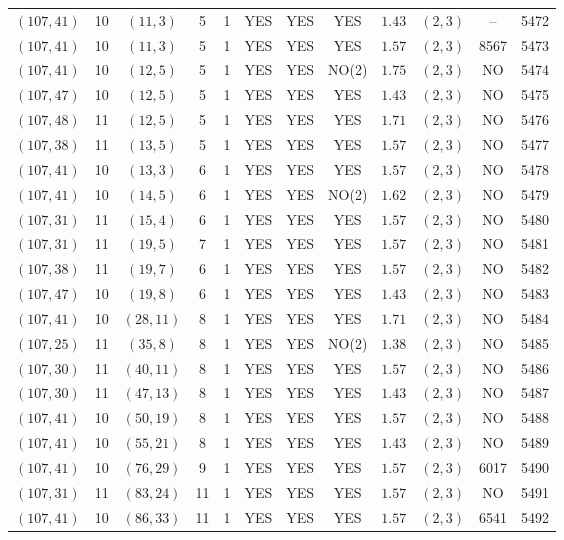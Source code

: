 \begin{longtable}{|c|c|c|c|c|c|c|c|c|c|c|c|}
$(107,41)$ & 10 & $(11,3)$ & 5 & 1 & YES & YES & YES & $1.43$ & $(2,3)$ & -- & 5472\\
$(107,41)$ & 10 & $(11,3)$ & 5 & 1 & YES & YES & YES & $1.57$ & $(2,3)$ & 8567 & 5473\\
$(107,41)$ & 10 & $(12,5)$ & 5 & 1 & YES & YES & NO(2) & $1.75$ & $(2,3)$ & NO & 5474\\
$(107,47)$ & 10 & $(12,5)$ & 5 & 1 & YES & YES & YES & $1.43$ & $(2,3)$ & NO & 5475\\
$(107,48)$ & 11 & $(12,5)$ & 5 & 1 & YES & YES & YES & $1.71$ & $(2,3)$ & NO & 5476\\
$(107,38)$ & 11 & $(13,5)$ & 5 & 1 & YES & YES & YES & $1.57$ & $(2,3)$ & NO & 5477\\
$(107,41)$ & 10 & $(13,3)$ & 6 & 1 & YES & YES & YES & $1.57$ & $(2,3)$ & NO & 5478\\
$(107,41)$ & 10 & $(14,5)$ & 6 & 1 & YES & YES & NO(2) & $1.62$ & $(2,3)$ & NO & 5479\\
$(107,31)$ & 11 & $(15,4)$ & 6 & 1 & YES & YES & YES & $1.57$ & $(2,3)$ & NO & 5480\\
$(107,31)$ & 11 & $(19,5)$ & 7 & 1 & YES & YES & YES & $1.57$ & $(2,3)$ & NO & 5481\\
$(107,38)$ & 11 & $(19,7)$ & 6 & 1 & YES & YES & YES & $1.57$ & $(2,3)$ & NO & 5482\\
$(107,47)$ & 10 & $(19,8)$ & 6 & 1 & YES & YES & YES & $1.43$ & $(2,3)$ & NO & 5483\\
$(107,41)$ & 10 & $(28,11)$ & 8 & 1 & YES & YES & YES & $1.71$ & $(2,3)$ & NO & 5484\\
$(107,25)$ & 11 & $(35,8)$ & 8 & 1 & YES & YES & NO(2) & $1.38$ & $(2,3)$ & NO & 5485\\
$(107,30)$ & 11 & $(40,11)$ & 8 & 1 & YES & YES & YES & $1.57$ & $(2,3)$ & NO & 5486\\
$(107,30)$ & 11 & $(47,13)$ & 8 & 1 & YES & YES & YES & $1.43$ & $(2,3)$ & NO & 5487\\
$(107,41)$ & 10 & $(50,19)$ & 8 & 1 & YES & YES & YES & $1.57$ & $(2,3)$ & NO & 5488\\
$(107,41)$ & 10 & $(55,21)$ & 8 & 1 & YES & YES & YES & $1.43$ & $(2,3)$ & NO & 5489\\
$(107,41)$ & 10 & $(76,29)$ & 9 & 1 & YES & YES & YES & $1.57$ & $(2,3)$ & 6017 & 5490\\
$(107,31)$ & 11 & $(83,24)$ & 11 & 1 & YES & YES & YES & $1.57$ & $(2,3)$ & NO & 5491\\
$(107,41)$ & 10 & $(86,33)$ & 11 & 1 & YES & YES & YES & $1.57$ & $(2,3)$ & 6541 & 5492\\

\end{longtable}
